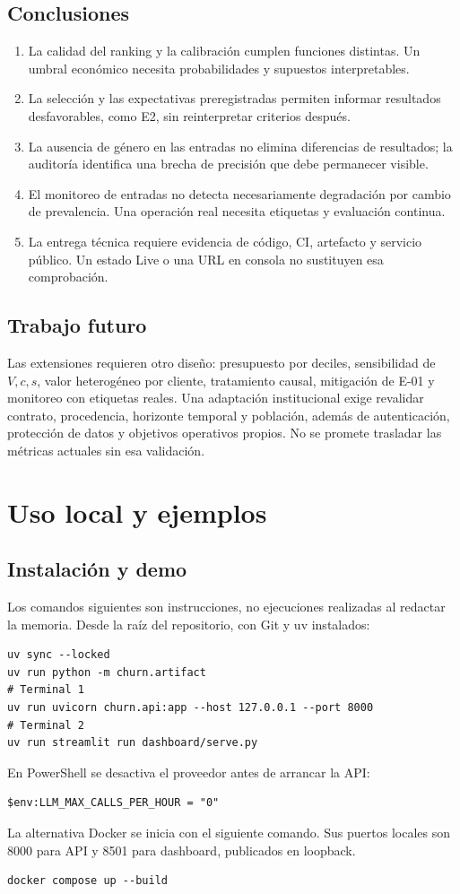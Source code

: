 \documentclass[11pt,a4paper,oneside]{report}
\begin{document}
\section{Conclusiones}
\begin{enumerate}
\item La calidad del ranking y la calibración cumplen funciones distintas.
  Un umbral económico necesita probabilidades y supuestos interpretables.
\item La selección y las expectativas preregistradas permiten informar
  resultados desfavorables, como E2, sin reinterpretar criterios después.
\item La ausencia de género en las entradas no elimina diferencias de resultados;
  la auditoría identifica una brecha de precisión que debe permanecer visible.
\item El monitoreo de entradas no detecta necesariamente degradación por cambio
  de prevalencia. Una operación real necesita etiquetas y evaluación continua.
\item La entrega técnica requiere evidencia de código, CI, artefacto y servicio
  público. Un estado Live o una URL en consola no sustituyen esa comprobación.
\end{enumerate}

\section{Trabajo futuro}
Las extensiones requieren otro diseño: presupuesto por deciles, sensibilidad
de $V,c,s$, valor heterogéneo por cliente, tratamiento causal, mitigación de
E-01 y monitoreo con etiquetas reales. Una adaptación institucional exige
revalidar contrato, procedencia, horizonte temporal y población, además de
autenticación, protección de datos y objetivos operativos propios. No se
promete trasladar las métricas actuales sin esa validación.

\appendix
\chapter{Uso local y ejemplos}
\section{Instalación y demo}
Los comandos siguientes son instrucciones, no ejecuciones realizadas al
redactar la memoria. Desde la raíz del repositorio, con Git y uv instalados:
\begin{lstlisting}
uv sync --locked
uv run python -m churn.artifact
# Terminal 1
uv run uvicorn churn.api:app --host 127.0.0.1 --port 8000
# Terminal 2
uv run streamlit run dashboard/serve.py
\end{lstlisting}
En PowerShell se desactiva el proveedor antes de arrancar la API:
\begin{lstlisting}
$env:LLM_MAX_CALLS_PER_HOUR = "0"
\end{lstlisting}
La alternativa Docker se inicia con el siguiente comando. Sus puertos locales
son 8000 para API y 8501 para dashboard, publicados en loopback.
\begin{lstlisting}
docker compose up --build
\end{lstlisting}
\end{document}
